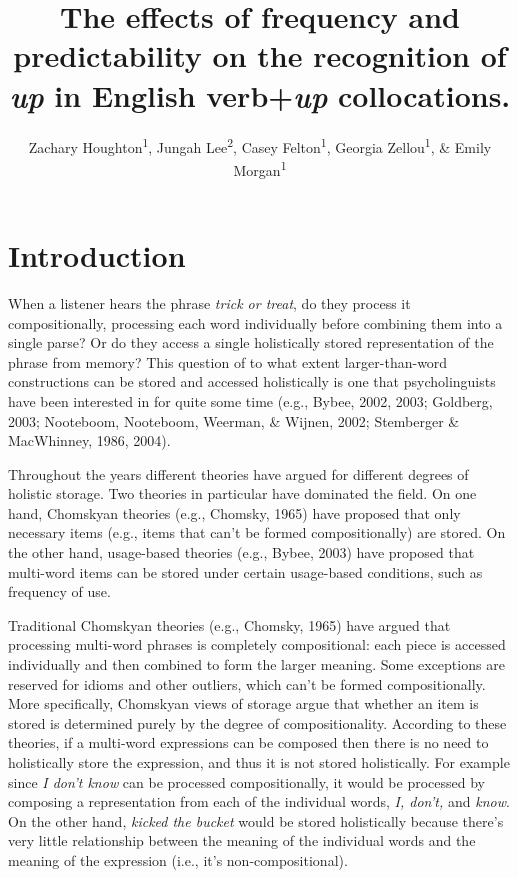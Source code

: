 \documentclass[
  man,floatsintext]{apa6}
\title{The effects of frequency and predictability on the recognition of \emph{up} in English verb+\emph{up} collocations.}
\author{Zachary Houghton\textsuperscript{1}, Jungah Lee\textsuperscript{2}, Casey Felton\textsuperscript{1}, Georgia Zellou\textsuperscript{1}, \& Emily Morgan\textsuperscript{1}}
\date{}
\affiliation{\vspace{0.5cm}\textsuperscript{1} University of California, Davis\\\textsuperscript{2} Chosun University}
\begin{document}
\maketitle

\section{Introduction}\label{introduction}

When a listener hears the phrase \emph{trick or treat}, do they process it compositionally, processing each word individually before combining them into a single parse? Or do they access a single holistically stored representation of the phrase from memory? This question of to what extent larger-than-word constructions can be stored and accessed holistically is one that psycholinguists have been interested in for quite some time (e.g., Bybee, 2002, 2003; Goldberg, 2003; Nooteboom, Nooteboom, Weerman, \& Wijnen, 2002; Stemberger \& MacWhinney, 1986, 2004).

Throughout the years different theories have argued for different degrees of holistic storage. Two theories in particular have dominated the field. On one hand, Chomskyan theories (e.g., Chomsky, 1965) have proposed that only necessary items (e.g., items that can't be formed compositionally) are stored. On the other hand, usage-based theories (e.g., Bybee, 2003) have proposed that multi-word items can be stored under certain usage-based conditions, such as frequency of use.

Traditional Chomskyan theories (e.g., Chomsky, 1965) have argued that processing multi-word phrases is completely compositional: each piece is accessed individually and then combined to form the larger meaning. Some exceptions are reserved for idioms and other outliers, which can't be formed compositionally. More specifically, Chomskyan views of storage argue that whether an item is stored is determined purely by the degree of compositionality. According to these theories, if a multi-word expressions can be composed then there is no need to holistically store the expression, and thus it is not stored holistically. For example since \emph{I don't know} can be processed compositionally, it would be processed by composing a representation from each of the individual words, \emph{I, don't,} and \emph{know}. On the other hand, \emph{kicked the bucket} would be stored holistically because there's very little relationship between the meaning of the individual words and the meaning of the expression (i.e., it's non-compositional).
\end{document}
